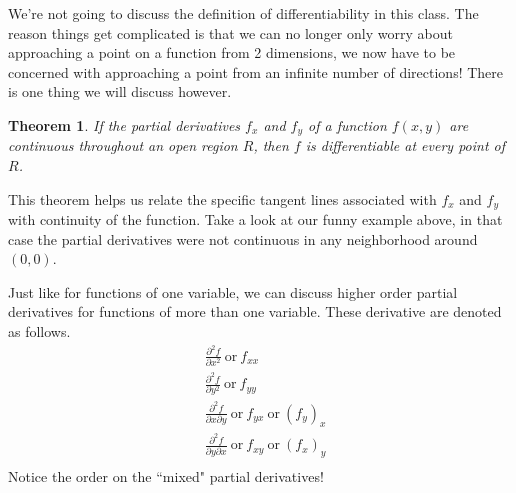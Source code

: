 \documentclass[12pt, letter]{article}
\theoremstyle{plain}
\newtheorem{theorem}{Theorem}
\numberwithin{theorem}{section}
\theoremstyle{definition}
\begin{document}
\bigskip

\hrulefill

\bigskip

We're not going to discuss the definition of differentiability in this class. The reason things get complicated is that we can no longer only worry about approaching a point on a function from 2 dimensions, we now have to be concerned with approaching a point from an infinite number of directions! There is one thing we will discuss however.

\bigskip

\begin{theorem}
If the partial derivatives $f_x$ and $f_y$ of a function $f(x,y)$ are continuous throughout an open region $R$, then $f$ is differentiable at every point of $R$.
\end{theorem}

\bigskip

This theorem helps us relate the specific tangent lines associated with $f_x$ and $f_y$ with continuity of the function. Take a look at our funny example above, in that case the partial derivatives were not continuous in any neighborhood around $(0,0)$.

\bigskip

\hrulefill

\bigskip

Just like for functions of one variable, we can discuss higher order partial derivatives for functions of more than one variable. These derivative are denoted as follows.
\begin{align*}
&\frac{\partial^2 f}{\partial x^2} \ \text{or} \ f_{xx}\\
&\frac{\partial^2 f}{\partial y^2} \ \text{or} \ f_{yy}\\
&\frac{\partial^2 f}{\partial x \partial y} \ \text{or} \ f_{yx} \ \text{or} \ (f_y)_x\\
&\frac{\partial^2 f}{\partial y \partial x} \ \text{or} \ f_{xy} \ \text{or} \ (f_x)_y\\
\end{align*}
Notice the order on the ``mixed" partial derivatives!

\bigskip

\hrulefill

\bigskip
\end{document}
